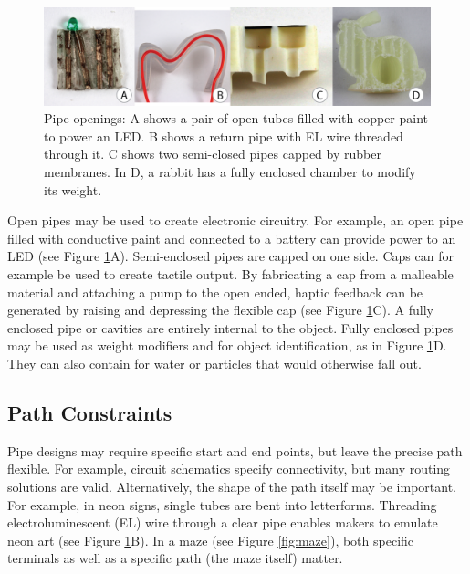 \begin{figure}[t]
\centering
    \includegraphics[width=1.0\columnwidth]{figures/types.png}
\caption{Pipe openings: A shows a pair of open tubes filled with copper paint to power an LED.  B shows a return pipe with EL wire threaded through it.  C shows two semi-closed pipes capped by rubber membranes.  In D, a rabbit has a fully enclosed chamber to modify its weight.}
\label{fig:openings}
\end{figure}

Open pipes may be used to create electronic circuitry.  For example, an open pipe filled with conductive paint and connected to a battery can provide power to an LED (see Figure \ref{fig:openings}A).
%
Semi-enclosed pipes are capped on one side. Caps can for example be used to create tactile output. By fabricating a cap from a malleable material and attaching a pump to the open ended, haptic feedback can be generated by raising and depressing the flexible cap (see Figure \ref{fig:openings}C).
%
A fully enclosed pipe or cavities are entirely internal to the object.  Fully enclosed pipes may be used as weight modifiers and for object identification, as in Figure \ref{fig:openings}D.  They can also contain for water or particles that would otherwise fall out.

\subsection{Path Constraints}
Pipe designs may require specific start and end points, but leave the precise path flexible. For example, circuit schematics specify connectivity, but many routing solutions are valid. Alternatively, the shape of the path itself may be important. For example, in neon signs, single tubes are bent into letterforms. Threading
 electroluminescent (EL) wire through a clear pipe enables makers to emulate neon art (see Figure \ref{fig:openings}B). 
In a maze (see Figure \ref{fig:maze}), both specific terminals as well as a specific path (the maze itself) matter. 

